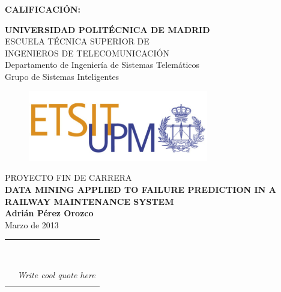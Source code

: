 {\large{\bf CALIFICACIÓN:}}
\pagestyle{empty}
\cleardoublepage
\vspace*{\baselineskip}
\begin{center}
	{\LARGE\rm\textbf{UNIVERSIDAD POLITÉCNICA DE MADRID}\\
	\vspace{1.0cm}
	 ESCUELA TÉCNICA SUPERIOR DE\\ INGENIEROS DE TELECOMUNICACIÓN
	  }  \\

	 {\Large\rm Departamento de Ingeniería de Sistemas Telemáticos\\
	 Grupo de Sistemas Inteligentes  }  \\

\begin{figure}[!htbp]
	\centering
    \includegraphics[width=0.7\textwidth]{img/logo_etsit.jpg}

\end{figure}
	\vspace{1.0cm}
	{{\LARGE\rm PROYECTO FIN DE CARRERA\\
	\vspace{1.0cm}
	 \textbf{DATA MINING APPLIED TO FAILURE PREDICTION IN A RAILWAY MAINTENANCE SYSTEM} }}  \\
	 \vspace{1.0cm}
     \Large\rm\textbf{Adrián Pérez Orozco}\\
	 \vspace{1.0cm}
	 Marzo de 2013
\end{center}  

\cleardoublepage

\begin{tabular}{p{10cm}p{4cm}}
&\\
&\\
&\\
&\\
&\\
&\\
&\\
&\\
&\\
&\emph{Write cool quote here}\\
&\\
\end{tabular}